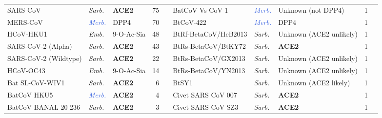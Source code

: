 \begin{table}[htbp]
\begin{tabular}{lllrclllrc}
SARS-CoV              & \textit{\textcolor{BrickRed}{Sarb.}} & \textbf{ACE2}               & 75    & \cite{li2003}        & BatCoV Vs-CoV 1               & \textit{\textcolor{RoyalBlue}{Merb.}} & Unknown (not DPP4)                        & 1     & \cite{yuan2025}                                                                             \\
MERS-CoV              & \textit{\textcolor{RoyalBlue}{Merb.}} & DPP4               & 70    & \cite{raj2013}           & BtCoV-422                      & \textit{\textcolor{RoyalBlue}{Merb.}} & DPP4                    & 1     & \cite{yuan2025}        \\
HCoV-HKU1             & \textit{\textcolor{OliveGreen}{Emb.}}  &  9-O-Ac-Sia         & 48    & \cite{hulswit2019}                & BtRf-BetaCoV/HeB2013           & \textit{\textcolor{BrickRed}{Sarb.}} & Unknown (ACE2 unlikely) & 1     & \cite{wang2025}          \\
SARS-CoV-2 (Alpha)    & \textit{\textcolor{BrickRed}{Sarb.}} & \textbf{ACE2}               & 43    & \cite{letko2020, lan2020, shang2020}     & BtRs-BetaCoV/BtKY72            & \textit{\textcolor{BrickRed}{Sarb.}} & \textbf{ACE2}                    & 1     & \cite{su2024}           \\
SARS-CoV-2 (Wildtype) & \textit{\textcolor{BrickRed}{Sarb.}} & \textbf{ACE2}               & 22    & \cite{letko2020, lan2020, shang2020}     & BtRs-BetaCoV/GX2013            & \textit{\textcolor{BrickRed}{Sarb.}} & Unknown (ACE2 unlikely) & 1     & \cite{wang2025}          \\
HCoV-OC43             & \textit{\textcolor{OliveGreen}{Emb.}}  & 9-O-Ac-Sia         & 14    & \cite{hulswit2019}        & BtRs-BetaCoV/YN2013            & \textit{\textcolor{BrickRed}{Sarb.}} & Unknown (ACE2 unlikely) & 1     & \cite{roelle2022}    \\
Bat SL-CoV-WIV1       & \textit{\textcolor{BrickRed}{Sarb.}} & \textbf{ACE2}               & 6     & \cite{letko2020} & BtSY1                          & \textit{\textcolor{BrickRed}{Sarb.}} &  Unknown (ACE2 likely) &  1 & \cite{xu2025b} \\
BatCoV HKU5           & \textit{\textcolor{RoyalBlue}{Merb.}} & \textbf{ACE2}               & 4     & \cite{catanzaro2025}    & Civet SARS CoV 007             & \textit{\textcolor{BrickRed}{Sarb.}} & \textbf{ACE2}                    & 1     & \cite{li2006} \\
BatCoV BANAL-20-236   & \textit{\textcolor{BrickRed}{Sarb.}} & \textbf{ACE2}               & 3     & \cite{temmam2022}   & Civet SARS CoV SZ3             & \textit{\textcolor{BrickRed}{Sarb.}} & \textbf{ACE2}                    & 1     & \cite{li2006} \\

\end{tabular}
\end{table}
